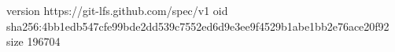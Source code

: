 version https://git-lfs.github.com/spec/v1
oid sha256:4bb1edb547cfe99bde2dd539c7552ed6d9e3ee9f4529b1abe1bb2e76ace20f92
size 196704
